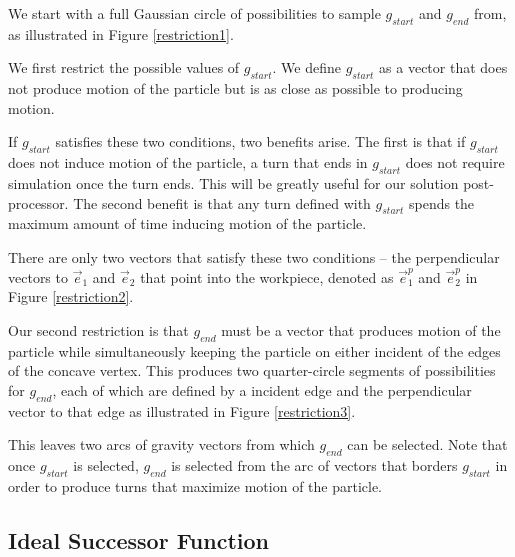 
We start with a full Gaussian circle of possibilities to sample $g_{start}$ and $g_{end}$ from, as illustrated in Figure \ref{restriction1}.


We first restrict the possible values of $g_{start}$. We define $g_{start}$ as a vector that does not produce motion of the particle but is as close as possible to producing motion.

If $g_{start}$ satisfies these two conditions, two benefits arise. The first is that if $g_{start}$ does not induce motion of the particle, a turn that ends in $g_{start}$ does not require simulation once the turn ends. This will be greatly useful for our solution post-processor. The second benefit is that any turn defined with $g_{start}$ spends the maximum amount of time inducing motion of the particle.

There are only two vectors that satisfy these two conditions -- the perpendicular vectors to $\vec{e}_1$ and $\vec{e}_2$ that point into the workpiece, denoted as $\vec{e}_1^p$ and $\vec{e}_2^p$ in Figure \ref{restriction2}.


Our second restriction is that $g_{end}$ must be a vector that produces motion of the particle while simultaneously keeping the particle on either incident of the edges of the concave vertex. This produces two quarter-circle segments of possibilities for $g_{end}$, each of which are defined by a incident edge and the perpendicular vector to that edge as illustrated in Figure \ref{restriction3}.



This leaves two arcs of gravity vectors from which $g_{end}$ can be selected. Note that once $g_{start}$ is selected, $g_{end}$ is selected from the arc of vectors that borders $g_{start}$ in order to produce turns that maximize motion of the particle.

	\subsection{Ideal Successor Function}


